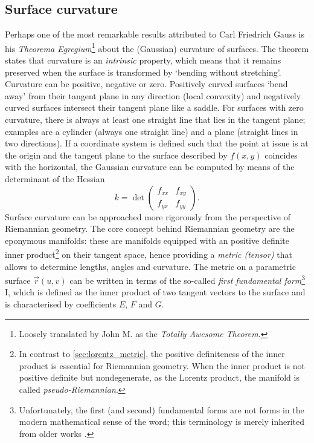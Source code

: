 \subsection{Surface curvature}
\label{ssec:curvature}
Perhaps one of the most remarkable results attributed to Carl Friedrich Gauss is his \emph{Theorema Egregium}\footnote{Loosely translated by John M. \citet{Lee1997} as the \emph{Totally Awesome Theorem}.} about the (Gaussian) curvature of surfaces. The theorem states that curvature is an \emph{intrinsic} property, which means that it remains preserved when the surface is transformed by `bending without stretching'. Curvature can be positive, negative or zero. Positively curved surfaces `bend away' from their tangent plane in any direction (local convexity) and negatively curved surfaces intersect their tangent plane like a saddle. For surfaces with zero curvature, there is always at least one straight line that lies in the tangent plane; examples are a cylinder (always one straight line) and a plane (straight lines in two directions). If a coordinate system is defined such that the point at issue is at the origin and the tangent plane to the surface described by \(f(x, y)\) coincides with the horizontal, the Gaussian curvature can be computed by means of the determinant of the Hessian \cite{Thurston1997, ONeill2006}
\[ 
    k = \det 
    \begin{pmatrix}
            f_{xx} & f_{xy}\\
            f_{yx} & f_{yy}
    \end{pmatrix}.
\]
    Surface curvature can be approached more rigorously from the perspective of Riemannian geometry. The core concept behind Riemannian geometry are the eponymous manifolds: these are manifolds equipped with an positive definite inner product\footnote{In contrast to \cref{sec:lorentz_metric}, the positive definiteness of the inner product is essential for Riemannian geometry. When the inner product is not positive definite but nondegenerate, as the Lorentz product, the manifold is called \emph{pseudo-Riemannian}.} on their tangent space, hence providing a \emph{metric (tensor)} that allows to determine lengths, angles and curvature. The metric on a parametric surface \(\vec{r}(u, v)\) can be written in terms of the so-called \emph{first fundamental form}\footnote{Unfortunately, the first (and second) fundamental forms are not forms in the modern mathematical sense of the word; this terminology is merely inherited from older works \cite{Spivak1999b}.} I, which is defined as the inner product of two tangent vectors to the surface  and is characterised by coefficients \(E\), \(F\) and \(G\).

